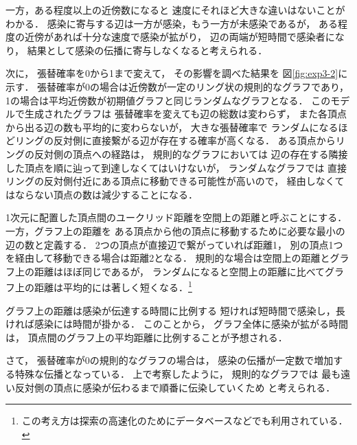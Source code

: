 \documentclass[10pt,oneside]{scrartcl}
\begin{document}
一方，ある程度以上の近傍数になると
速度にそれほど大きな違いはないことがわかる．
感染に寄与する辺は一方が感染，もう一方が未感染であるが，
ある程度の近傍があれば十分な速度で感染が拡がり，
辺の両端が短時間で感染者になり，
結果として感染の伝播に寄与しなくなると考えられる．

\begin{figure*}%
  \centering
\end{figure*}

次に，
張替確率を0から1まで変えて，
その影響を調べた結果を
図\ref{fig:exp3-2}に示す．
張替確率が0の場合は近傍数が一定のリング状の規則的なグラフであり，
1の場合は平均近傍数が初期値グラフと同じランダムなグラフとなる．
このモデルで生成されたグラフは
張替確率を変えても辺の総数は変わらず，
また各頂点から出る辺の数も平均的に変わらないが，
大きな張替確率で
ランダムになるほどリングの反対側に直接繋がる辺が存在する確率が高くなる．
ある頂点からリングの反対側の頂点への経路は，
規則的なグラフにおいては
辺の存在する隣接した頂点を順に辿って到達しなくてはいけないが，
ランダムなグラフでは
直接リングの反対側付近にある頂点に移動できる可能性が高いので，
経由しなくてはならない頂点の数は減少することになる．

1次元に配置した頂点間のユークリッド距離を空間上の距離と呼ぶことにする．
一方，グラフ上の距離を
ある頂点から他の頂点に移動するために必要な最小の辺の数と定義する．
2つの頂点が直接辺で繋がっていれば距離1，
別の頂点1つを経由して移動できる場合は距離2となる．
規則的な場合は空間上の距離とグラフ上の距離はほぼ同じであるが，
ランダムになると空間上の距離に比べてグラフ上の距離は平均的には著しく短くなる．\footnote{この考え方は探索の高速化のためにデータベースなどでも利用されている．}

グラフ上の距離は感染が伝達する時間に比例する
短ければ短時間で感染し，長ければ感染には時間が掛かる．
このことから，
グラフ全体に感染が拡がる時間は，
頂点間のグラフ上の平均距離に比例することが予想される．

さて，
張替確率が0の規則的なグラフの場合は，
感染の伝播が一定数で増加する特殊な伝播となっている．
上で考察したように，
規則的なグラフでは
最も遠い反対側の頂点に感染が伝わるまで順番に伝染していくため
と考えられる．
\end{document}
